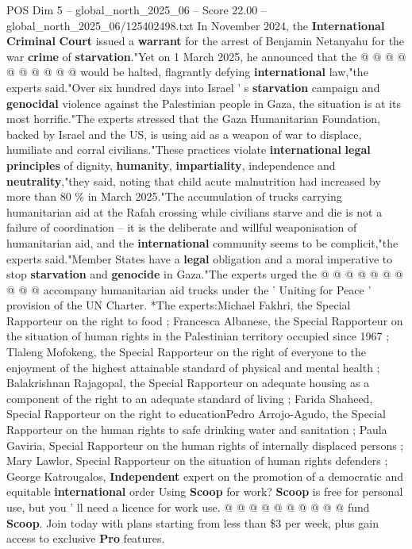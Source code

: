 \begin{textsample}{POS Dim 5 – global\_north\_2025\_06 – Score 22.00 – global\_north\_2025\_06/125402498.txt}
In November 2024, the \textbf{International} \textbf{Criminal} \textbf{Court} issued a \textbf{warrant} for the arrest of Benjamin Netanyahu for the war \textbf{crime} of \textbf{starvation}."Yet on 1 March 2025, he announced that the @ @ @ @ @ @ @ @ @ @ would be halted, flagrantly defying \textbf{international} law,"the experts said."Over six hundred days into Israel ' s \textbf{starvation} campaign and \textbf{genocidal} violence against the Palestinian people in Gaza, the situation is at its most horrific."The experts stressed that the Gaza Humanitarian Foundation, backed by Israel and the US, is using aid as a weapon of war to displace, humiliate and corral civilians."These practices violate \textbf{international} \textbf{legal} \textbf{principles} of dignity, \textbf{humanity}, \textbf{impartiality}, independence and \textbf{neutrality},"they said, noting that child acute malnutrition had increased by more than 80 \% in March 2025."The accumulation of trucks carrying humanitarian aid at the Rafah crossing while civilians starve and die is not a failure of coordination -- it is the deliberate and willful weaponisation of humanitarian aid, and the \textbf{international} community seems to be complicit,"the experts said."Member States have a \textbf{legal} obligation and a moral imperative to stop \textbf{starvation} and \textbf{genocide} in Gaza."The experts urged the @ @ @ @ @ @ @ @ @ @ accompany humanitarian aid trucks under the ' Uniting for Peace ' provision of the UN Charter. *The experts:Michael Fakhri, the Special Rapporteur on the right to food ; Francesca Albanese, the Special Rapporteur on the situation of human rights in the Palestinian territory occupied since 1967 ; Tlaleng Mofokeng, the Special Rapporteur on the right of everyone to the enjoyment of the highest attainable standard of physical and mental health ; Balakrishnan Rajagopal, the Special Rapporteur on adequate housing as a component of the right to an adequate standard of living ; Farida Shaheed, Special Rapporteur on the right to educationPedro Arrojo-Agudo, the Special Rapporteur on the human rights to safe drinking water and sanitation ; Paula Gaviria, Special Rapporteur on the human rights of internally displaced persons ; Mary Lawlor, Special Rapporteur on the situation of human rights defenders ; George Katrougalos, \textbf{Independent} expert on the promotion of a democratic and equitable \textbf{international} order Using \textbf{Scoop} for work? \textbf{Scoop} is free for personal use, but you ' ll need a licence for work use. @ @ @ @ @ @ @ @ @ @ fund \textbf{Scoop}.
Join today with plans starting from less than \$3 per week, plus gain access to exclusive \textbf{Pro} features.

\end{textsample}
